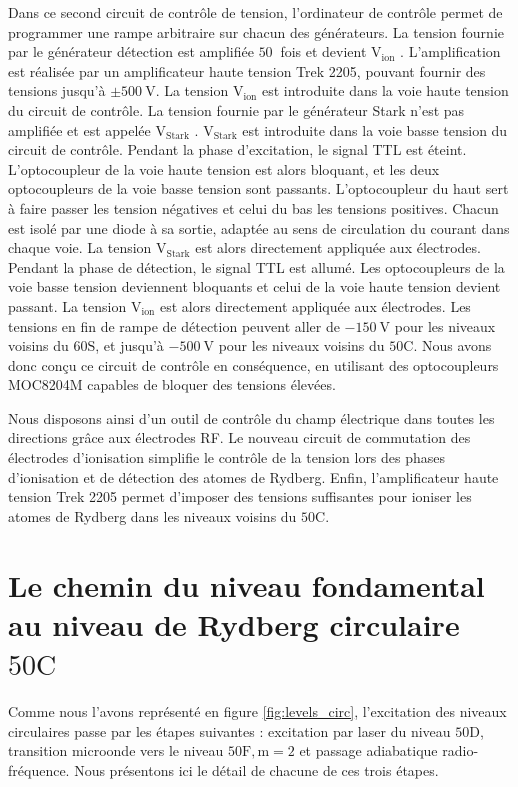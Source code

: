 Dans ce second circuit de contrôle de tension, l'ordinateur de contrôle permet de programmer une rampe arbitraire sur chacun des générateurs.
La tension fournie par le générateur \og détection \fg{} est amplifiée $\SI{50}{}$ fois et devient \og $\mathrm{V_{ion}}$ \fg{}.
L'amplification est réalisée par un amplificateur haute tension Trek 2205, pouvant fournir des tensions jusqu'à $\pm\SI{500}{\V}$.
La tension $\mathrm{V_{ion}}$ est introduite dans la voie haute tension du circuit de contrôle.
La tension fournie par le générateur \og Stark \fg{} n'est pas amplifiée et est appelée \og $\mathrm{V_{Stark}}$ \fg{}.
$\mathrm{V_{Stark}}$ est introduite dans la voie basse tension du circuit de contrôle.
Pendant la phase d'excitation, le signal TTL est éteint. L'optocoupleur de la voie haute tension est alors bloquant, et les deux optocoupleurs de la voie basse tension sont passants.
L'optocoupleur du haut sert à faire passer les tension négatives et celui du bas les tensions positives.
Chacun est isolé par une diode à sa sortie, adaptée au sens de circulation du courant dans chaque voie.
La tension $\mathrm{V_{Stark}}$ est alors directement appliquée aux électrodes.
Pendant la phase de détection, le signal TTL est allumé. Les optocoupleurs de la voie basse tension deviennent bloquants et celui de la voie haute tension devient passant.
La tension $\mathrm{V_{ion}}$ est alors directement appliquée aux électrodes.
Les tensions en fin de rampe de détection peuvent aller de $\SI{-150}{\V}$ pour les niveaux voisins du $\mathrm{60S}$, et jusqu'à $\SI{-500}{\V}$ pour les niveaux voisins du $\mathrm{50C}$.
Nous avons donc conçu ce circuit de contrôle en conséquence, en utilisant des optocoupleurs MOC8204M capables de bloquer des tensions élevées.

Nous disposons ainsi d'un outil de contrôle du champ électrique dans toutes les directions grâce aux électrodes RF.
Le nouveau circuit de commutation des électrodes d'ionisation simplifie le contrôle de la tension lors des phases d'ionisation et de détection des atomes de Rydberg.
Enfin, l'amplificateur haute tension Trek 2205 permet d'imposer des tensions suffisantes pour ioniser les atomes de Rydberg dans les niveaux voisins du $\mathrm{50C}$.


\section{Le chemin du niveau fondamental au niveau de Rydberg circulaire $\mathrm{50C}$}
\noindent Comme nous l'avons représenté en figure \eqref{fig:levels_circ}, l'excitation des niveaux circulaires passe par les étapes suivantes : excitation par laser du niveau $\mathrm{50D}$, transition microonde vers le niveau $\mathrm{50F,m=2}$ et passage adiabatique radio-fréquence.
Nous présentons ici le détail de chacune de ces trois étapes.

